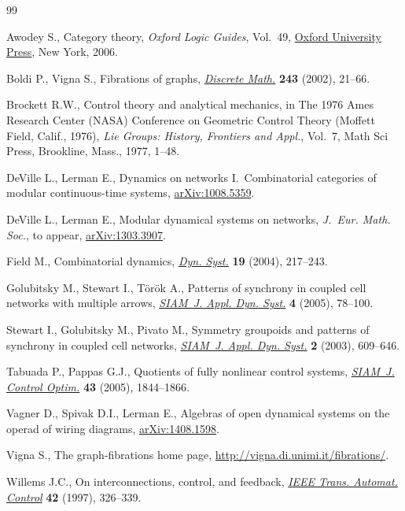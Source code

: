 \documentclass[10pt,a4paper]{amsart}
\numberwithin{equation}{section}
\begin{document}

\begin{thebibliography}{99}
\footnotesize \itemsep=0pt

Awodey S., Category theory, \textit{Oxford Logic Guides}, Vol.~49, \href{http://dx.doi.org/10.1093/acprof:oso/9780198568612.001.0001}{Oxford University Press}, New York, 2006.

Boldi P., Vigna S., Fibrations of graphs, \href{http://dx.doi.org/10.1016/S0012-365X(00)00455-6}{\textit{Discrete Math.}} \textbf{243}
  (2002), 21--66.

Brockett R.W., Control theory and analytical mechanics, in The 1976 {A}mes
  {R}esearch {C}enter ({NASA}) {C}onference on {G}eometric {C}ontrol {T}heory
  ({M}of\/fett {F}ield, {C}alif., 1976), \textit{Lie Groups: History, Frontiers
  and Appl.}, Vol.~7, Math Sci Press, Brookline, Mass., 1977, 1--48.

DeVille L., Lerman E., Dynamics on networks I.~Combinatorial categories of
  modular continuous-time systems, \href{http://arxiv.org/abs/1008.5359}{arXiv:1008.5359}.

DeVille L., Lerman E., Modular dynamical systems on networks, \textit{J.~Eur.
  Math. Soc.}, {t}o appear, \href{http://arxiv.org/abs/1303.3907}{arXiv:1303.3907}.

Field M., Combinatorial dynamics, \href{http://dx.doi.org/10.1080/14689360410001729379}{\textit{Dyn. Syst.}} \textbf{19} (2004),
  217--243.

Golubitsky M., Stewart I., T{\"o}r{\"o}k A., Patterns of synchrony in coupled
  cell networks with multiple arrows, \href{http://dx.doi.org/10.1137/040612634}{\textit{SIAM~J. Appl. Dyn. Syst.}}
  \textbf{4} (2005), 78--100.

Stewart I., Golubitsky M., Pivato M., Symmetry groupoids and patterns of
  synchrony in coupled cell networks, \href{http://dx.doi.org/10.1137/S1111111103419896}{\textit{SIAM~J. Appl. Dyn. Syst.}}
  \textbf{2} (2003), 609--646.

Tabuada P., Pappas G.J., Quotients of fully nonlinear control systems,
  \href{http://dx.doi.org/10.1137/S0363012901399027}{\textit{SIAM~J. Control Optim.}} \textbf{43} (2005), 1844--1866.

Vagner D., Spivak D.I., Lerman E., Algebras of open dynamical systems on the
  operad of wiring diagrams, \href{http://arxiv.org/abs/1408.1598}{arXiv:1408.1598}.

Vigna S., The graph-fibrations home page, \url{http://vigna.di.unimi.it/fibrations/}.

Willems J.C., On interconnections, control, and feedback, \href{http://dx.doi.org/10.1109/9.557576}{\textit{IEEE Trans.
  Automat. Control}} \textbf{42} (1997), 326--339.

\end{thebibliography}
\end{document}
